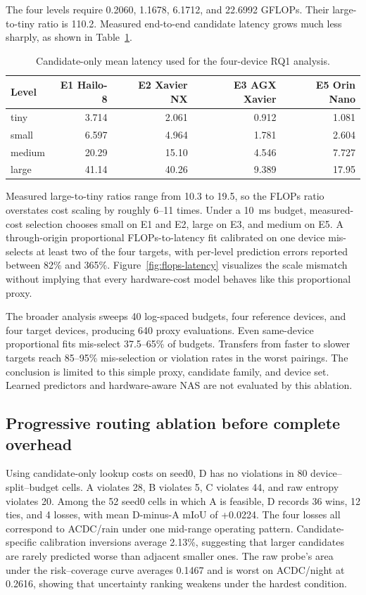 \documentclass[a4paper,review,12pt]{elsarticle}
\newcommand{\miou}{mIoU}
\begin{document}
The four levels require 0.2060, 1.1678, 6.1712, and 22.6992 GFLOPs. Their large-to-tiny ratio is 110.2. Measured end-to-end candidate latency grows much less sharply, as shown in Table~\ref{tab:latency}.

\begin{table}[t]
\centering
\caption{Candidate-only mean latency used for the four-device RQ1 analysis.}
\label{tab:latency}
\begin{tabular}{@{}lrrrr@{}}
\toprule
Level & E1 Hailo-8 & E2 Xavier NX & E3 AGX Xavier & E5 Orin Nano \\
\midrule
tiny & 3.714 & 2.061 & 0.912 & 1.081 \\
small & 6.597 & 4.964 & 1.781 & 2.604 \\
medium & 20.29 & 15.10 & 4.546 & 7.727 \\
large & 41.14 & 40.26 & 9.389 & 17.95 \\
\bottomrule
\end{tabular}
\end{table}

Measured large-to-tiny ratios range from 10.3 to 19.5, so the FLOPs ratio overstates cost scaling by roughly 6--11 times. Under a 10~ms budget, measured-cost selection chooses small on E1 and E2, large on E3, and medium on E5. A through-origin proportional FLOPs-to-latency fit calibrated on one device mis-selects at least two of the four targets, with per-level prediction errors reported between 82\% and 365\%. Figure~\ref{fig:flops-latency} visualizes the scale mismatch without implying that every hardware-cost model behaves like this proportional proxy.



The broader analysis sweeps 40 log-spaced budgets, four reference devices, and four target devices, producing 640 proxy evaluations. Even same-device proportional fits mis-select 37.5--65\% of budgets. Transfers from faster to slower targets reach 85--95\% mis-selection or violation rates in the worst pairings. The conclusion is limited to this simple proxy, candidate family, and device set. Learned predictors and hardware-aware NAS are not evaluated by this ablation.

\subsection{Progressive routing ablation before complete overhead}

Using candidate-only lookup costs on seed0, D has no violations in 80 device--split--budget cells. A violates 28, B violates 5, C violates 44, and raw entropy violates 20. Among the 52 seed0 cells in which A is feasible, D records 36 wins, 12 ties, and 4 losses, with mean D-minus-A \miou{} of +0.0224. The four losses all correspond to ACDC/rain under one mid-range operating pattern. Candidate-specific calibration inversions average 2.13\%, suggesting that larger candidates are rarely predicted worse than adjacent smaller ones. The raw probe's area under the risk--coverage curve averages 0.1467 and is worst on ACDC/night at 0.2616, showing that uncertainty ranking weakens under the hardest condition.
\end{document}

